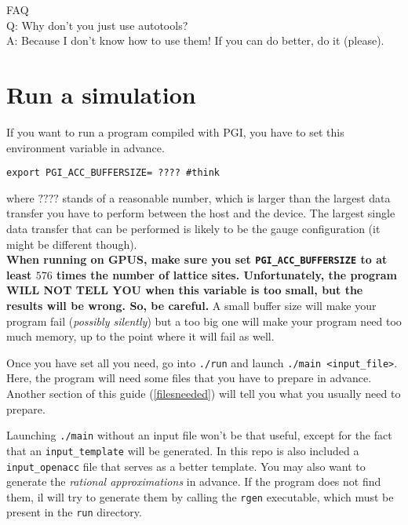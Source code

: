 FAQ \\
Q: Why don't you just use autotools? \\
A: Because I don't know how to use them! If you can do better, do
it (please).



\section{Run a simulation}

If you want to run a program compiled with PGI, you have to set this 
environment variable in advance.
\begin{verbatim}
export PGI_ACC_BUFFERSIZE= ???? #think
\end{verbatim}
where $????$ stands of a reasonable number, which is larger than the largest 
data transfer you have to perform between the host and the device. The largest 
single data transfer that can be performed is likely to be the gauge 
configuration (it might be different though). \\
{ \bf When running on GPUS, make sure you set \verb|PGI_ACC_BUFFERSIZE| to at 
    least $576$ times the number of lattice sites. Unfortunately, the program WILL 
    NOT TELL YOU when this variable is too small, but the results will be wrong. 
So, be careful.}
A small buffer size will make your program fail (\emph{possibly silently}) 
but a too big one will make your program need too much memory, up to the point 
where it will fail as well.


Once you have set all you need, go into \verb|./run| and launch 
\verb|./main <input_file>|. Here, the program 
will  need some  files that you have to prepare in advance. Another section
of this guide (\ref{filesneeded}) will tell you what you usually need to 
prepare.

Launching \verb|./main| without an input file won't be that useful,
except for the fact that an \verb|input_template| will be generated.
In this repo is also included a \verb|input_openacc| file that serves as
a better template.
You may also want to generate the \emph{rational approximations} in advance. If 
the
program does not find them, il will try to generate them by calling 
the \verb|rgen| executable, which must be present in the \verb|run| directory.


